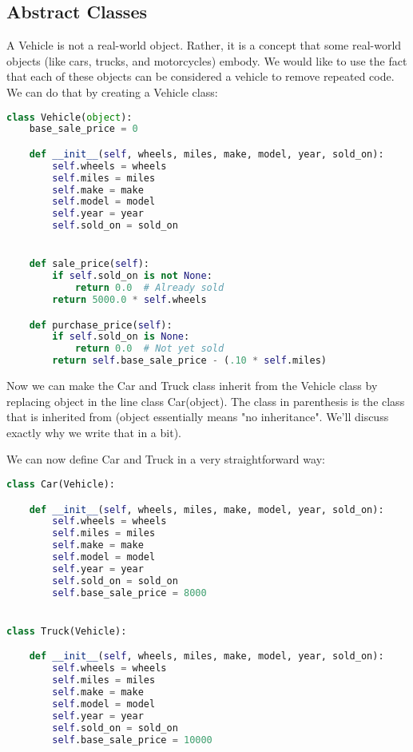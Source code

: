 \subsection{Abstract Classes}

A Vehicle is not a real-world object. Rather, it is a concept that some real-world objects (like cars, trucks, and motorcycles) embody. We would like to use the fact that each of these objects can be considered a vehicle to remove repeated code. We can do that by creating a Vehicle class:

\begin{lstlisting}[language=Python]
class Vehicle(object):
    base_sale_price = 0

    def __init__(self, wheels, miles, make, model, year, sold_on):
        self.wheels = wheels
        self.miles = miles
        self.make = make
        self.model = model
        self.year = year
        self.sold_on = sold_on


    def sale_price(self):
        if self.sold_on is not None:
            return 0.0  # Already sold
        return 5000.0 * self.wheels

    def purchase_price(self):
        if self.sold_on is None:
            return 0.0  # Not yet sold
        return self.base_sale_price - (.10 * self.miles)
\end{lstlisting}

Now we can make the Car and Truck class inherit from the Vehicle class by replacing object in the line class Car(object). The class in parenthesis is the class that is inherited from (object essentially means "no inheritance". We'll discuss exactly why we write that in a bit).

We can now define Car and Truck in a very straightforward way:

\begin{lstlisting}[language=Python]
class Car(Vehicle):

    def __init__(self, wheels, miles, make, model, year, sold_on):
        self.wheels = wheels
        self.miles = miles
        self.make = make
        self.model = model
        self.year = year
        self.sold_on = sold_on
        self.base_sale_price = 8000


class Truck(Vehicle):

    def __init__(self, wheels, miles, make, model, year, sold_on):
        self.wheels = wheels
        self.miles = miles
        self.make = make
        self.model = model
        self.year = year
        self.sold_on = sold_on
        self.base_sale_price = 10000
\end{lstlisting}

